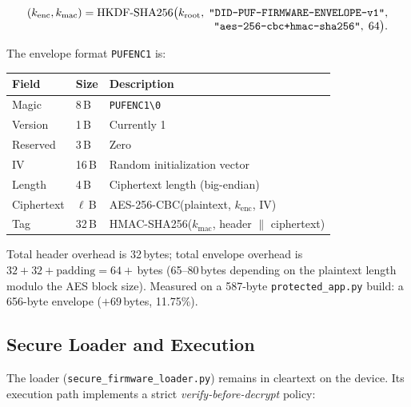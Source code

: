 \documentclass[runningheads]{llncs}
\begin{document}
\begin{equation}
\begin{array}{l}
(k_{\mathrm{enc}}, k_{\mathrm{mac}}) =
  \mathrm{HKDF}\mbox{-}\mathrm{SHA256}\bigl(
  k_{\mathrm{root}},\;
  \mbox{\texttt{"DID-PUF-FIRMWARE-ENVELOPE-v1"}},\\
\hfill
  \mbox{\texttt{"aes-256-cbc+hmac-sha256"}},\;
  64\bigr).
\end{array}
\label{eq:subkeys}
\end{equation}

The envelope format \texttt{PUFENC1} is:

\begin{center}
\begin{tabular}{lll}
\toprule
Field & Size & Description \\
\midrule
Magic    & 8\,B  & \texttt{PUFENC1\textbackslash 0} \\
Version  & 1\,B  & Currently 1 \\
Reserved & 3\,B  & Zero \\
IV       & 16\,B & Random initialization vector \\
Length   & 4\,B  & Ciphertext length (big-endian) \\
Ciphertext & $\ell$\,B & AES-256-CBC(plaintext, $k_{\mathrm{enc}}$, IV) \\
Tag      & 32\,B & HMAC-SHA256($k_{\mathrm{mac}}$, header $\|$ ciphertext) \\
\bottomrule
\end{tabular}
\end{center}

\noindent Total header overhead is 32\,bytes; total envelope overhead is $32 + 32 + \mathrm{padding} = 64{+}$\,bytes (65--80\,bytes depending on the plaintext length modulo the AES block size). Measured on a 587-byte \texttt{protected\_app.py} build: a 656-byte envelope ($+69$\,bytes, 11.75\%).

\subsection{Secure Loader and Execution}

The loader (\texttt{secure\_firmware\_loader.py}) remains in cleartext on the device. Its execution path implements a strict \emph{verify-before-decrypt} policy:
\end{document}
